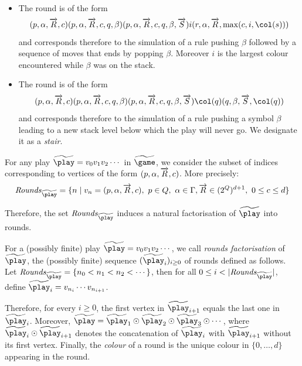 \begin{itemize}

\item The round is of the form
$$(p,\alpha,\vect{R},c)(p,\alpha,\vect{R},c,q,\beta)(p,\alpha,\vect{R},c,q,\beta,\vect{S})i (r,\alpha,\vect{R},\max(c,i,\pdscol{s}))$$ and
corresponds therefore to the simulation of a rule pushing $\beta$
followed by a sequence of moves that ends by popping $\beta$. Moreover $i$ is the largest colour encountered while $\beta$ was on the stack.

\item The round is of the form
$$(p,\alpha,\vect{R},c)(p,\alpha,\vect{R},c,q,\beta)(p,\alpha,\vect{R},c,q,\beta,\vect{S})\pdscol{q}(q,\beta,\vect{S},\pdscol{q})$$ and
corresponds therefore to the simulation of a rule pushing a symbol $\beta$
leading to a new stack level below which the play will never go. We designate it as a \emph{stair}.


\end{itemize}

For any play $\fplay=v_0v_1v_2\cdots$ in $\fgame$, we consider the
subset of indices corresponding to vertices of the form
$(p,\alpha,\overrightarrow{R},c)$. More precisely:
\begin{equation*}
\Rounds{\fplay}=\{n\mid v_n=(p,\alpha,\vect{R},c),\ p\in Q,\
\alpha\in\Gamma,\\ \vect{R}\in(2^Q)^{d+1},\
0\leq c\leq d\}
\end{equation*}

Therefore, the set $\Rounds{\fplay}$ induces a natural factorisation
of $\fplay$ into rounds.

\begin{definition}
For a (possibly finite) play $\fplay=v_0v_1v_2\cdots$, we call
\emph{rounds factorisation} of $\fplay$, the (possibly finite) sequence
$(\fplay_i)_{i\geq 0}$ of rounds defined as follows. Let
$\Rounds{\fplay}=\{n_0<n_1<n_2<\cdots\}$, then for all $0\leq i<|\Rounds{\fplay}|$,
define $\fplay_i=v_{n_i}\cdots v_{n_{i+1}}$.

Therefore, for every $i\geq 0$, the first vertex in $\fplay_{i+1}$ equals
the last one in $\fplay_i$. Moreover,
$\fplay=\fplay_1\odot\fplay_2\odot\fplay_3\odot\cdots$, where
$\fplay_i\odot\fplay_{i+1}$ denotes the concatenation of $\fplay_i$
with $\fplay_{i+1}$ without its first vertex.
%
Finally, the \emph{colour} of a round is the unique colour in
$\{0,\dots,d\}$ appearing in the round.
\end{definition}

